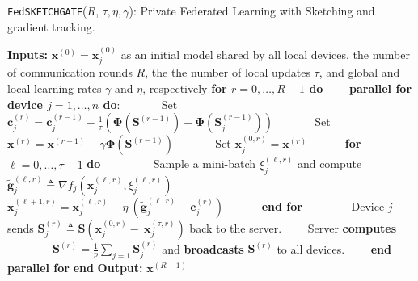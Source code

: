 \begin{algorithm}[H]
\caption{\texttt{FedSKETCHGATE}($R$, $\tau, \eta, \gamma$): Private Federated Learning with Sketching and gradient tracking. }\label{Alg:PFLHet}
\begin{algorithmic}[1]
\State \textbf{Inputs:} $\boldsymbol{x}^{(0)}=\boldsymbol{x}^{(0)}_j$ as an initial  model shared by all local devices, the number of communication rounds $R$, the the number of local updates $\tau$, and global and local learning rates $\gamma$ and $\eta$, respectively
\State \textbf{for $r=0, \ldots, R-1$ do}
\State $\qquad$\textbf{parallel for device $j=1,\ldots,n$ do}:
\State $\qquad\quad$ Set $\mathbf{c}_j^{(r)}=\mathbf{c}_j^{(r-1)}-\frac{1}{\tau}\left(\mathbf{\Phi}\left(\mathbf{S}^{(r-1)}\right)-\mathbf{\Phi}\left(\mathbf{S}^{(r-1)}_{j}\right)\right)$
\State $\qquad\quad$ Set $\boldsymbol{x}^{(r)}=\boldsymbol{x}^{(r-1)}-\gamma\mathbf{\Phi}\left(\mathbf{S}^{(r-1)}\right)$
\State $\qquad\quad$ Set $\boldsymbol{x}_j^{(0,r)}=\boldsymbol{x}^{(r)}$ %
\State $\qquad\quad $\textbf{for} $\ell=0,\ldots,\tau-1$ \textbf{do}
\State $\qquad\quad\quad$ Sample a mini-batch $\xi_j^{(\ell,r)}$ and compute $\tilde{\mathbf{g}}_{j}^{(\ell,r)}\triangleq\nabla{f}_j(\boldsymbol{x}^{(\ell,r)}_j,\xi_j^{(\ell,r)})$
\State $\qquad\quad\quad$ $\boldsymbol{x}^{(\ell+1,r)}_{j}=\boldsymbol{x}^{(\ell,r)}_j-\eta~\left( \tilde{\mathbf{g}}_{j}^{(\ell,r)}-\mathbf{c}_j^{(r)}\right)$ \label{eq:update-rule-alg}
\State $\qquad\quad$\textbf{end for}
\State $\qquad\quad\quad$Device $j$ sends $\mathbf{S}^{(r)}_{j}\triangleq\mathbf{S}\left(\boldsymbol{x}_j^{(0,r)}-~{\boldsymbol{x}}_{j}^{(\tau,r)}\right)$ back to the server.
\State $\qquad$Server \textbf{computes} 
\State $\qquad\qquad {\mathbf{S}}^{(r)}=\frac{1}{p}\sum_{j=1}\mathbf{S}^{(r)}_{j}$ and  \textbf{broadcasts} ${\mathbf{S}}^{(r)}$ to all devices.
\State $\qquad$\textbf{end parallel for}
\State \textbf{end}
\State \textbf{Output:} ${\boldsymbol{x}}^{(R-1)}$
\vspace{- 0.1cm}
\end{algorithmic}
\end{algorithm}


